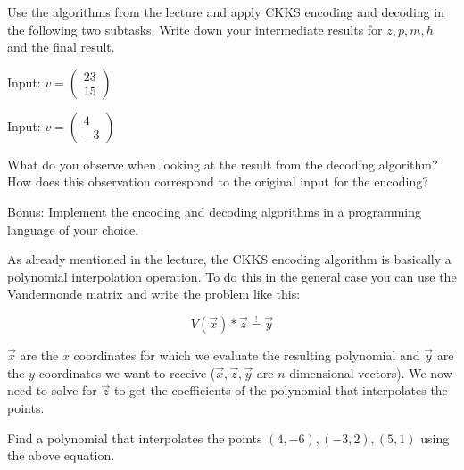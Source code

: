 \begin{aufgabe}
Use the algorithms from the lecture and apply CKKS encoding and decoding in the following two subtasks.
Write down your intermediate results for $z, p, m, h$ and the final result.

\begin{teilaufgabe}
\item Input: $v= \left(\begin{array}{c} 23 \\ 15  \end{array}\right)$
\end{teilaufgabe}

\begin{teilaufgabe}
\item Input: $v= \left(\begin{array}{c} 4 \\ -3  \end{array}\right)$
\end{teilaufgabe}

\begin{teilaufgabe}
\item What do you observe when looking at the result from the decoding algorithm? How does this observation correspond to the original input for the encoding?
\end{teilaufgabe}

\begin{teilaufgabe}
\item Bonus: Implement the encoding and decoding algorithms in a programming language of your choice.
\end{teilaufgabe}

\end{aufgabe}



\begin{aufgabe}
As already mentioned in the lecture, the CKKS encoding algorithm is basically a polynomial interpolation operation.
To do this in the general case you can use the Vandermonde matrix and write the problem like this:


\[
V(\vec{x}) * \vec{z} \stackrel{!}{=} \vec{y}
\]

$\vec{x}$ are the $x$ coordinates for which we evaluate the resulting polynomial and $\vec{y}$ are the $y$ coordinates we want to receive ($\vec{x},\vec{z},\vec{y}$ are $n$-dimensional vectors).
We now need to solve for $\vec{z}$ to get the coefficients of the polynomial that interpolates the points.

Find a polynomial that interpolates the points $(4,-6), (-3,2), (5,1)$ using the above equation.


\end{aufgabe}
